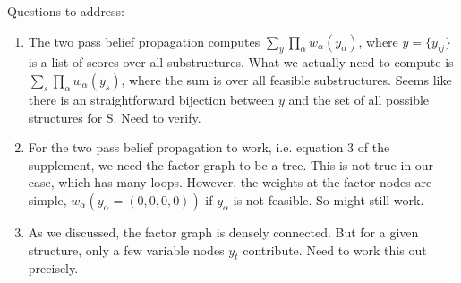 \documentclass[idxtotoc,hyperref,openany]{labbook} %
\begin{document}
Questions to address:
\begin{enumerate}
\item The two pass belief propagation computes $\sum_{y} \prod_{\alpha} w_{\alpha}(y_{\alpha})$, where $y=\{y_{ij}\}$ is a list of scores over all substructures. What we actually need to compute is $\sum_{s} \prod_{\alpha} w_{\alpha}(y_{s})$, where the sum is over all feasible substructures. Seems like there is an straightforward bijection between $y$ and the set of all possible structures for S. Need to verify.
\item For the two pass belief propagation to work, i.e. equation 3 of the supplement, we need the factor graph to be a tree. This is not true in our case, which has many loops. However, the weights at the factor nodes are simple, $w_{\alpha}(y_{\alpha}=(0, 0, 0, 0))$ if $y_{\alpha}$ is not feasible. So might still work.
\item As we discussed, the factor graph is densely connected. But for a given structure, only a few variable nodes $y_t$ contribute. Need to work this out precisely.
\end{enumerate}
\end{document}
